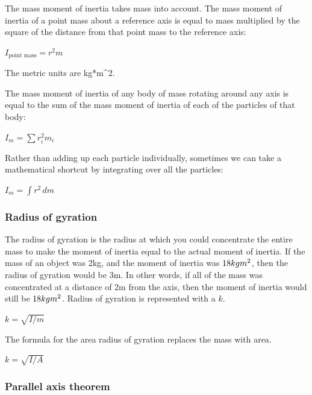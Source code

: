 The mass moment of inertia takes mass into account. The mass moment of inertia of a point mass about a reference axis is equal to mass multiplied by the square of the distance from that point mass to the reference axis:


$I _\text{point mass} = r^2 m \,$


The metric units are kg*m^2.


The mass moment of inertia of any body of mass rotating around any axis is equal to the sum of the mass moment of inertia of each of the particles of that body:


$I_m = \sum r_i^2 m_i$


Rather than adding up each particle individually, sometimes we can take a mathematical shortcut by integrating over all the particles:


$I_m = \int r^2 \,dm$


\subsubsection{Radius of gyration}
\label{sss:radi-d7ff}


The radius of gyration is the radius at which you could concentrate the entire mass to make the moment of inertia equal to the actual moment of inertia. If the mass of an object was 2kg, and the moment of inertia was $18kg\*m^2$, then the radius of gyration would be 3m. In other words, if all of the mass was concentrated at a distance of 2m from the axis, then the moment of inertia would still be $18kg\*m^2$. Radius of gyration is represented with a $k$.


$k=\sqrt{I/m}\,$


The formula for the area radius of gyration replaces the mass with area.


$k=\sqrt{I/A}\,$


\subsubsection{Parallel axis theorem}
\label{sss:para-6dbb}



